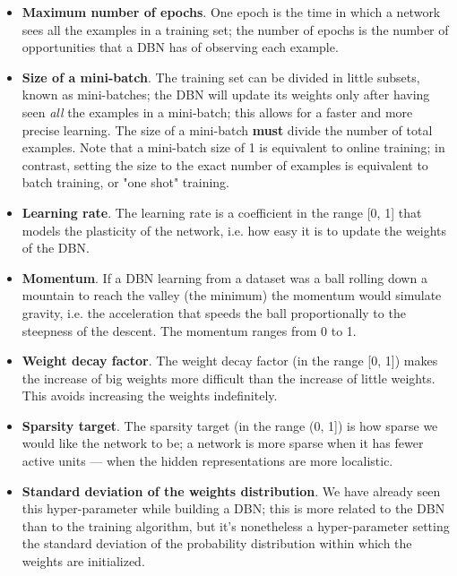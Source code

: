 \documentclass[a4paper]{article}
\begin{document}
	\begin{itemize}
		
			
	\item \textbf{Maximum number of epochs}. One epoch is the time in which a network sees all the examples in a training set; the number of epochs is the number of opportunities that a DBN has of observing each example.
			
	\item \textbf{Size of a mini-batch}. The training set can be divided in little subsets, known as mini-batches; the DBN will update its weights only after having seen \emph{all} the examples in a mini-batch; this allows for a faster and more precise learning. The size of a mini-batch \textbf{must} divide the number of total examples. Note that a mini-batch size of 1 is equivalent to online training; in contrast, setting the size to the exact number of examples is equivalent to batch training, or "one shot" training.
			
	\item \textbf{Learning rate}. The learning rate is a coefficient in the range [0, 1] that models the plasticity of the network, i.e. how easy it is to update the weights of the DBN.
			
	\item \textbf{Momentum}. If a DBN learning from a dataset was a ball rolling down a mountain to reach the valley (the minimum) the momentum would simulate gravity, i.e. the acceleration that speeds the ball proportionally to the steepness of the descent. The momentum ranges from 0 to 1.
			
	\item \textbf{Weight decay factor}. The weight decay factor (in the range [0, 1]) makes the increase of big weights more difficult than the increase of little weights. This avoids increasing the weights indefinitely.
			
	\item \textbf{Sparsity target}. The sparsity target (in the range (0, 1]) is how sparse we would like the network to be; a network is more sparse when it has fewer active units --- when the hidden representations are more localistic.
			
	\item \textbf{Standard deviation of the weights distribution}. We have already seen this hyper-parameter while building a DBN; this is more related to the DBN than to the training algorithm, but it's nonetheless a hyper-parameter setting the standard deviation of the probability distribution within which the weights are initialized.
		
	\end{itemize}
\end{document}
